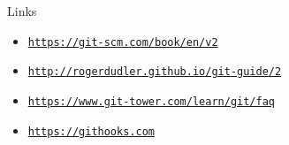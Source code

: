 \documentclass[10pt]{beamer}
\newcommand{\urlCustom}[1]{\href{https://#1}{\textcolor{greyCustom}{\texttt{#1}}}}
\begin{document}
\begin{frame}{Links}
	\begin{itemize}
		\item\urlCustom{https://git-scm.com/book/en/v2}
		\item\urlCustom{http://rogerdudler.github.io/git-guide/2}
		\item\urlCustom{https://www.git-tower.com/learn/git/faq}
		\item\urlCustom{https://githooks.com}
	\end{itemize}
	\begin{center}\doclicenseThis\end{center}
\end{frame}
\end{document}

